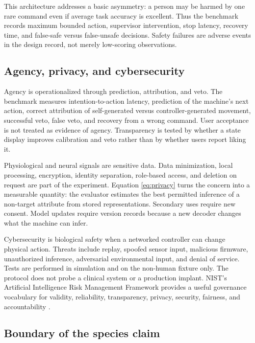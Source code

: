 \documentclass[conference]{IEEEtran}
\begin{document}
This architecture addresses a basic asymmetry: a person may be harmed by one rare command even if average task accuracy is excellent. Thus the benchmark records maximum bounded action, supervisor intervention, stop latency, recovery time, and false-safe versus false-unsafe decisions. Safety failures are adverse events in the design record, not merely low-scoring observations.

\subsection{Agency, privacy, and cybersecurity}

Agency is operationalized through prediction, attribution, and veto. The benchmark measures intention-to-action latency, prediction of the machine's next action, correct attribution of self-generated versus controller-generated movement, successful veto, false veto, and recovery from a wrong command. User acceptance is not treated as evidence of agency. Transparency is tested by whether a state display improves calibration and veto rather than by whether users report liking it.

Physiological and neural signals are sensitive data. Data minimization, local processing, encryption, identity separation, role-based access, and deletion on request are part of the experiment. Equation \eqref{eq:privacy} turns the concern into a measurable quantity: the evaluator estimates the best permitted inference of a non-target attribute from stored representations. Secondary uses require new consent. Model updates require version records because a new decoder changes what the machine can infer.

Cybersecurity is biological safety when a networked controller can change physical action. Threats include replay, spoofed sensor input, malicious firmware, unauthorized inference, adversarial environmental input, and denial of service. Tests are performed in simulation and on the non-human fixture only. The protocol does not probe a clinical system or a production implant. NIST's Artificial Intelligence Risk Management Framework provides a useful governance vocabulary for validity, reliability, transparency, privacy, security, fairness, and accountability \cite{nistairmf}.

\subsection{Boundary of the species claim}
\end{document}
